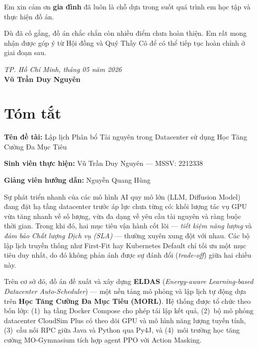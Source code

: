 \bigskip
\noindent
Em xin cảm ơn \textbf{gia đình} đã luôn là chỗ dựa trong suốt quá trình em học
tập và thực hiện đồ án.

\bigskip
\noindent
Dù đã cố gắng, đồ án chắc chắn còn nhiều điểm chưa hoàn thiện. Em rất mong
nhận được góp ý từ Hội đồng và Quý Thầy Cô để có thể tiếp tục hoàn chỉnh ở
giai đoạn sau.

\vspace{1.5cm}
\begin{flushright}
\textit{TP. Hồ Chí Minh, tháng 05 năm 2026}\\[0.4cm]
\textbf{Vũ Trần Duy Nguyên}
\end{flushright}

\newpage

\chapter*{Tóm tắt}
\thispagestyle{plain}

\noindent
\textbf{Tên đề tài:} Lập lịch Phân bổ Tài nguyên trong Datacenter sử dụng Học Tăng Cường
Đa Mục Tiêu

\medskip
\noindent
\textbf{Sinh viên thực hiện:} Vũ Trần Duy Nguyên --- MSSV: 2212338

\medskip
\noindent
\textbf{Giảng viên hướng dẫn:} Nguyễn Quang Hùng

\bigskip
\noindent
Sự phát triển nhanh của các mô hình AI quy mô lớn (LLM, Diffusion Model) đang
đặt hạ tầng datacenter trước áp lực chưa từng có: khối lượng tác vụ GPU vừa
tăng nhanh về số lượng, vừa đa dạng về yêu cầu tài nguyên và ràng buộc thời
gian. Trong khi đó, hai mục tiêu vận hành cốt lõi --- \textit{tiết kiệm năng
lượng} và \textit{đảm bảo Chất lượng Dịch vụ (SLA)} --- thường xuyên xung đột
với nhau. Các bộ lập lịch truyền thống như First-Fit hay Kubernetes Default chỉ
tối ưu một mục tiêu duy nhất, do đó không phản ánh được sự đánh đổi
(\textit{trade-off}) giữa hai chiều này.

\bigskip
\noindent
Trên cơ sở đó, đồ án đề xuất và xây dựng \textbf{ELDAS} (\textit{Energy-aware
Learning-based Datacenter Auto-Scheduler}) --- một nền tảng mô phỏng và lập
lịch tự động dựa trên \textbf{Học Tăng Cường Đa Mục Tiêu (MORL)}. Hệ thống
được tổ chức theo bốn lớp: (1)~hạ tầng Docker Compose cho phép tái lập kết
quả, (2)~bộ mô phỏng datacenter CloudSim Plus có theo dõi GPU và mô hình năng
lượng tuyến tính, (3)~cầu nối RPC giữa Java và Python qua Py4J, và (4)~môi
trường học tăng cường MO-Gymnasium tích hợp agent PPO với Action Masking.

